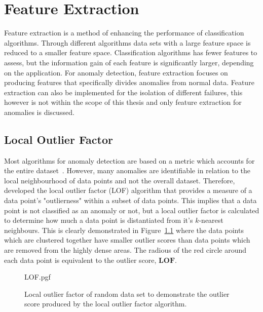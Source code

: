 \chapter{Feature Extraction}
\label{chap:Feature Extraction}
Feature extraction is a method of enhancing the performance of classification algorithms. Through different algorithms data sets with a large feature space is reduced to a smaller feature space. Classification algorithms has fewer features to assess, but the information gain of each feature is significantly larger, depending on the application. For anomaly detection, feature extraction focuses on producing features that specifically divides anomalies from normal data. Feature extraction can also be implemented for the isolation of different failures, this however is not within the scope of this thesis and only feature extraction for anomalies is discussed.


\section{Local Outlier Factor}
\label{section:OutlierFactor}
Most algorithms for anomaly detection are based on a metric which accounts for the entire dataset~\cite{breunig2000lof}. However, many anomalies are identifiable in relation to the local neighbourhood of data points and not the overall dataset. Therefore, \cite{breunig2000lof} developed the local outlier factor (LOF) algorithm that provides a measure of a data point's "outlierness" within a subset of data points. This implies that a data point is not classified as an anomaly or not, but a local outlier factor is calculated to determine how much a data point is distantiated from it's $k$-nearest neighbours. This is clearly demonstrated in Figure~\ref{fig:localOutlierFactor} where the data points which are clustered together have smaller outlier scores than data points which are removed from the highly dense areas. The radious of the red circle around each data point is equivalent to the outlier score, $\mathbf{LOF}$.

\begin{figure}[!hbt]
	\centering
	{LOF.pgf}
	\caption{Local outlier factor of random data set to demonstrate the outlier score produced by the local outlier factor algorithm.}
	\label{fig:localOutlierFactor}
\end{figure}

